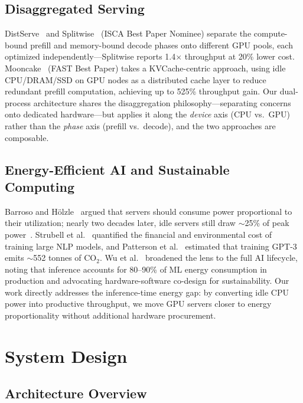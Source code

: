 \documentclass[10pt,conference]{IEEEtran}
\begin{document}
\subsection{Disaggregated Serving}
DistServe~\cite{zhong2024distserve} and Splitwise~\cite{patel2024splitwise} (ISCA Best Paper Nominee) separate the compute-bound prefill and memory-bound decode phases onto different GPU pools, each optimized independently---Splitwise reports 1.4$\times$ throughput at 20\% lower cost.
Mooncake~\cite{qin2025mooncake} (FAST Best Paper) takes a KVCache-centric approach, using idle CPU/DRAM/SSD on GPU nodes as a distributed cache layer to reduce redundant prefill computation, achieving up to 525\% throughput gain.
Our dual-process architecture shares the disaggregation philosophy---separating concerns onto dedicated hardware---but applies it along the \emph{device} axis (CPU vs.\ GPU) rather than the \emph{phase} axis (prefill vs.\ decode), and the two approaches are composable.

\subsection{Energy-Efficient AI and Sustainable Computing}
Barroso and H\"{o}lzle~\cite{barroso2007energy} argued that servers should consume power proportional to their utilization; nearly two decades later, idle servers still draw $\sim$25\% of peak power~\cite{specpower2024}.
Strubell et al.~\cite{strubell2019energy} quantified the financial and environmental cost of training large NLP models, and Patterson et al.~\cite{patterson2021carbon} estimated that training GPT-3 emits $\sim$552 tonnes of CO$_2$.
Wu et al.~\cite{wu2022sustainable} broadened the lens to the full AI lifecycle, noting that inference accounts for 80--90\% of ML energy consumption in production and advocating hardware-software co-design for sustainability.
Our work directly addresses the inference-time energy gap: by converting idle CPU power into productive throughput, we move GPU servers closer to energy proportionality without additional hardware procurement.

\section{System Design}
\label{sec:design}

\subsection{Architecture Overview}
\end{document}
